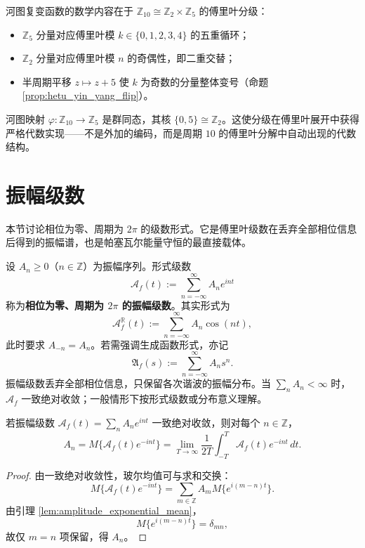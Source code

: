 \begin{remark}[河图结构的代数意义]\label{rem:hetu_algebraic_meaning}
河图复变函数的数学内容在于 $\mathbb{Z}_{10} \cong \mathbb{Z}_2 \times \mathbb{Z}_5$ 的傅里叶分级：
\begin{itemize}
    \item $\mathbb{Z}_5$ 分量对应傅里叶模 $k \in \{0,1,2,3,4\}$ 的五重循环；
    \item $\mathbb{Z}_2$ 分量对应傅里叶模 $n$ 的奇偶性，即二重交替；
    \item 半周期平移 $z \mapsto z + 5$ 使 $k$ 为奇数的分量整体变号（命题 \ref{prop:hetu_yin_yang_flip}）。
\end{itemize}
河图映射 $\varphi: \mathbb{Z}_{10} \to \mathbb{Z}_5$ 是群同态，其核 $\{0, 5\} \cong \mathbb{Z}_2$。这使分级在傅里叶展开中获得严格代数实现——不是外加的编码，而是周期 $10$ 的傅里叶分解中自动出现的代数结构。
\end{remark}

\section{\texorpdfstring{振幅级数}{振幅级数}}

本节讨论相位为零、周期为 $2\pi$ 的级数形式。它是傅里叶级数在丢弃全部相位信息后得到的振幅谱，也是帕塞瓦尔能量守恒的最直接载体。

\begin{definition}\label{def:amplitude_series}
设 $A_n \ge 0$（$n \in \mathbb{Z}$）为振幅序列。形式级数
\[
\mathcal{A}_f(t) := \sum_{n=-\infty}^{\infty} A_n e^{i n t}
\]
称为\textbf{相位为零、周期为 $2\pi$ 的振幅级数}。其实形式为
\[
\mathcal{A}_f^{\mathbb{R}}(t) := \sum_{n=-\infty}^{\infty} A_n \cos(nt),
\]
此时要求 $A_{-n}=A_n$。若需强调生成函数形式，亦记
\[
\mathfrak{A}_f(s) := \sum_{n=-\infty}^{\infty} A_n s^n.
\]
振幅级数丢弃全部相位信息，只保留各次谐波的振幅分布。当 $\sum_n A_n < \infty$ 时，$\mathcal{A}_f$ 一致绝对收敛；一般情形下按形式级数或分布意义理解。
\end{definition}

\begin{proposition}[振幅级数的玻尔均值系数公式]\label{prop:amplitude_bohr_mean}
若振幅级数 $\mathcal{A}_f(t)=\sum_n A_n e^{int}$ 一致绝对收敛，则对每个 $n \in \mathbb{Z}$，
\[
A_n = M\{\mathcal{A}_f(t)e^{-int}\}
= \lim_{T\to\infty}\frac{1}{2T}\int_{-T}^{T}\mathcal{A}_f(t)e^{-int}\,dt.
\]
\end{proposition}

\begin{proof}
由一致绝对收敛性，玻尔均值可与求和交换：
\[
M\{\mathcal{A}_f(t)e^{-int}\}
= \sum_{m\in\mathbb{Z}} A_m M\{e^{i(m-n)t}\}.
\]
由引理 \ref{lem:amplitude_exponential_mean}，
\[
M\{e^{i(m-n)t}\} = \delta_{mn},
\]
故仅 $m=n$ 项保留，得 $A_n$。
\end{proof}


